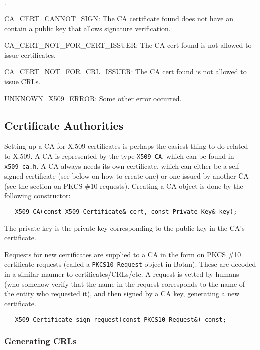 \documentclass{article}
\newcommand{\filename}[1]{\texttt{#1}}
\newcommand{\type}[1]{\texttt{#1}}
\begin{document}
\begin{list}{$\cdot$}
   \item CA\_CERT\_CANNOT\_SIGN: The CA certificate found does not have an
         contain a public key that allows signature verification.
   \item CA\_CERT\_NOT\_FOR\_CERT\_ISSUER: The CA cert found is not allowed to
         issue certificates.
   \item CA\_CERT\_NOT\_FOR\_CRL\_ISSUER: The CA cert found is not allowed to
         issue CRLs.

  \item UNKNOWN\_X509\_ERROR: Some other error occurred.

\end{list}

\subsection{Certificate Authorities}

Setting up a CA for X.509 certificates is perhaps the easiest thing to
do related to X.509. A CA is represented by the type \type{X509\_CA},
which can be found in \filename{x509\_ca.h}. A CA always needs its own
certificate, which can either be a self-signed certificate (see below
on how to create one) or one issued by another CA (see the section on
PKCS \#10 requests). Creating a CA object is done by the following
constructor:

\begin{verbatim}
   X509_CA(const X509_Certificate& cert, const Private_Key& key);
\end{verbatim}

The private key is the private key corresponding to the public key in the
CA's certificate.

Requests for new certificates are supplied to a CA in the form on PKCS
\#10 certificate requests (called a \type{PKCS10\_Request} object in
Botan). These are decoded in a similar manner to
certificates/CRLs/etc. A request is vetted by humans (who somehow
verify that the name in the request corresponds to the name of the
entity who requested it), and then signed by a CA key, generating a
new certificate.

\begin{verbatim}
   X509_Certificate sign_request(const PKCS10_Request&) const;
\end{verbatim}

\subsubsection{Generating CRLs}
\end{document}
